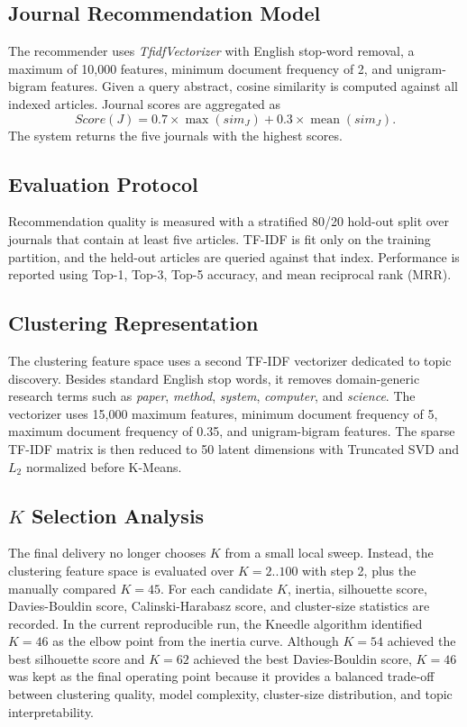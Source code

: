 \documentclass[conference]{IEEEtran}
\begin{document}
\subsection{Journal Recommendation Model}
The recommender uses \textit{TfidfVectorizer} with English stop-word removal, a maximum of 10,000 features, minimum document frequency of 2, and unigram-bigram features. Given a query abstract, cosine similarity is computed against all indexed articles. Journal scores are aggregated as
\begin{equation}
Score(J) = 0.7 \times \max(sim_J) + 0.3 \times \operatorname{mean}(sim_J).
\end{equation}
The system returns the five journals with the highest scores.

\subsection{Evaluation Protocol}
Recommendation quality is measured with a stratified 80/20 hold-out split over journals that contain at least five articles. TF-IDF is fit only on the training partition, and the held-out articles are queried against that index. Performance is reported using Top-1, Top-3, Top-5 accuracy, and mean reciprocal rank (MRR).

\subsection{Clustering Representation}
The clustering feature space uses a second TF-IDF vectorizer dedicated to topic discovery. Besides standard English stop words, it removes domain-generic research terms such as \textit{paper}, \textit{method}, \textit{system}, \textit{computer}, and \textit{science}. The vectorizer uses 15,000 maximum features, minimum document frequency of 5, maximum document frequency of 0.35, and unigram-bigram features. The sparse TF-IDF matrix is then reduced to 50 latent dimensions with Truncated SVD and $L_2$ normalized before K-Means.

\subsection{$K$ Selection Analysis}
The final delivery no longer chooses $K$ from a small local sweep. Instead, the clustering feature space is evaluated over $K=2..100$ with step 2, plus the manually compared $K=45$. For each candidate $K$, inertia, silhouette score, Davies-Bouldin score, Calinski-Harabasz score, and cluster-size statistics are recorded. In the current reproducible run, the Kneedle algorithm identified $K=46$ as the elbow point from the inertia curve. Although $K=54$ achieved the best silhouette score and $K=62$ achieved the best Davies-Bouldin score, $K=46$ was kept as the final operating point because it provides a balanced trade-off between clustering quality, model complexity, cluster-size distribution, and topic interpretability.
\end{document}
